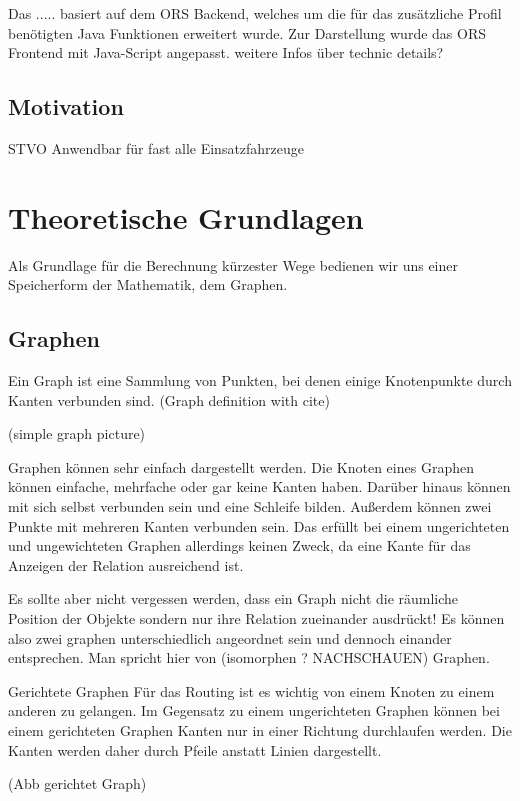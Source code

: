 \documentclass[10pt,a4paper]{article}
\begin{document}
Das ..... basiert auf dem ORS Backend, welches um die für das zusätzliche Profil benötigten Java Funktionen erweitert wurde. Zur Darstellung wurde das ORS Frontend mit Java-Script angepasst. 
weitere Infos über technic details? 

\subsection{Motivation}

STVO
Anwendbar für fast alle Einsatzfahrzeuge 

\section{Theoretische Grundlagen}

Als Grundlage für die Berechnung kürzester Wege bedienen wir uns einer Speicherform der Mathematik, dem Graphen.

\subsection{Graphen}

Ein Graph ist eine Sammlung von Punkten, bei denen einige Knotenpunkte durch Kanten verbunden sind. 
(Graph definition with cite)

(simple graph picture)

Graphen können sehr einfach dargestellt werden. Die Knoten eines Graphen können einfache, mehrfache oder gar keine Kanten haben. Darüber hinaus können mit sich selbst verbunden sein und eine Schleife bilden. Außerdem können zwei Punkte mit mehreren Kanten verbunden sein. Das erfüllt bei einem ungerichteten und ungewichteten Graphen allerdings keinen Zweck, da eine Kante für das Anzeigen der Relation ausreichend ist.

Es sollte aber nicht vergessen werden, dass ein Graph nicht die räumliche Position der Objekte sondern nur ihre Relation zueinander ausdrückt! Es können also zwei graphen unterschiedlich angeordnet sein und dennoch einander entsprechen. Man spricht hier von (isomorphen ? NACHSCHAUEN) Graphen.

Gerichtete Graphen
Für das Routing ist es wichtig von einem Knoten zu einem anderen zu gelangen. Im Gegensatz zu einem ungerichteten Graphen können bei einem gerichteten Graphen Kanten nur in einer Richtung durchlaufen werden. Die Kanten werden daher durch Pfeile anstatt Linien dargestellt. 

(Abb gerichtet Graph)
\end{document}
